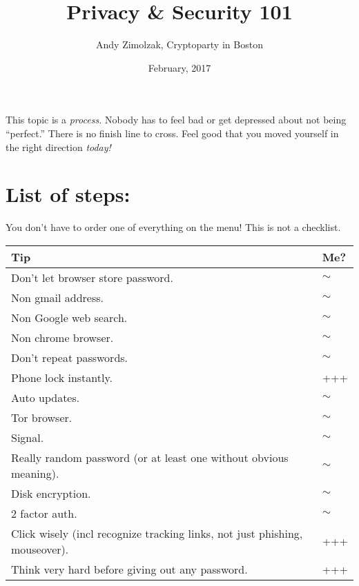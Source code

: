 \documentclass{tufte-handout}
\title{Privacy \& Security 101}
\author{Andy Zimolzak, Cryptoparty in Boston}
\date{February, 2017}
\begin{document}
\maketitle

This topic is a \emph{process.} Nobody has to feel bad or get depressed
about not being ``perfect.'' There is no finish line to cross. Feel good
that you moved yourself in the right direction \emph{today!}


\section{List of steps:}

You don't have to order one of everything on the menu! This is not a
checklist.

\begin{tabular}{p{5in}l}

\hline
\textbf{Tip} & \textbf{Me?} \\
\hline

Don't let browser store password. & $\sim$ \\

Non gmail address. & $\sim$ \\

Non Google web search. & $\sim$ \\

Non chrome browser. & $\sim$ \\

Don't repeat passwords. & $\sim$ \\

Phone lock instantly. & +++ \\

Auto updates. & $\sim$ \\

Tor browser. & $\sim$ \\

Signal. & $\sim$ \\

Really random password (or at least one without obvious meaning). & $\sim$ \\

Disk encryption. & $\sim$ \\

2 factor auth. & $\sim$ \\

Click wisely (incl recognize tracking links, not just phishing, mouseover). & +++ \\

Think very hard before giving out any password. & +++ \\


\end{tabular}
\end{document}
